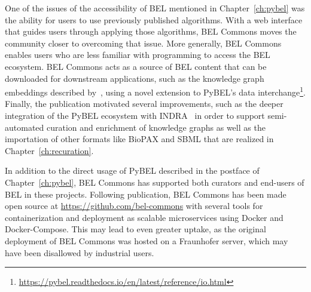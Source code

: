 One of the issues of the accessibility of \ac{BEL} mentioned in Chapter~\ref{ch:pybel} was the ability for users to use previously published algorithms.
With a web interface that guides users through applying those algorithms, BEL Commons moves the community closer to overcoming that issue.
More generally, BEL Commons enables users who are less familiar with programming to access the \ac{BEL} ecosystem.
BEL Commons acts as a source of BEL content that can be downloaded for downstream applications, such as the knowledge graph embeddings described by~\cite{Ali2019}, using a novel extension to PyBEL's data interchange\footnote{\url{https://pybel.readthedocs.io/en/latest/reference/io.html}}.
Finally, the publication motivated several improvements, such as the deeper integration of the PyBEL ecosystem with \ac{INDRA}~\cite{Gyori2017} in order to support semi-automated curation and enrichment of knowledge graphs as well as the importation of other formats like \ac{BioPAX} and \ac{SBML} that are realized in Chapter~\ref{ch:recuration}.

In addition to the direct usage of PyBEL described in the postface of Chapter~\ref{ch:pybel}, BEL Commons has supported both curators and end-users of BEL in these projects.
Following publication, BEL Commons has been made open source at \url{https://github.com/bel-commons} with several tools for containerization and deployment as scalable microservices using Docker and Docker-Compose.
This may lead to even greater uptake, as the original deployment of BEL Commons was hosted on a Fraunhofer server, which may have been disallowed by industrial users.
